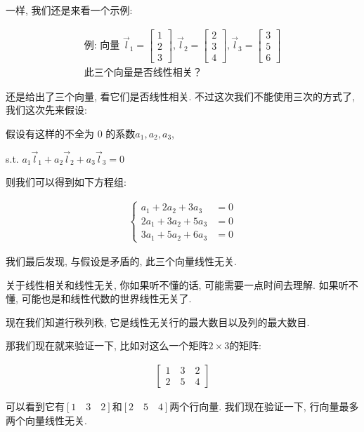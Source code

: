 一样, 我们还是来看一个示例: 

\begin{align*}
  \mbox{例: 向量 }\vec l_1 = \begin{bmatrix} 1 \\ 2 \\ 3  \end{bmatrix}, \vec l_2 = \begin{bmatrix} 2 \\ 3 \\ 4 \end{bmatrix}, \vec l_3 =  \begin{bmatrix} 3 \\ 5 \\ 6  \end{bmatrix} \\
  \mbox{此三个向量是否线性相关？}
\end{align*}

还是给出了三个向量, 看它们是否线性相关. 不过这次我们不能使用三次的方式了, 我们这次先来假设: 

假设有这样的不全为 0 的系数$a_1, a_2, a_3$, 

s.t. \(a_1 \vec l_1 + a_2 \vec l_2 + a_3 \vec l_3 = 0\)

则我们可以得到如下方程组: 

\begin{align*}
\begin{cases}
  a_1 + 2a_2 + 3a_3 & = 0 \\
  2a_1 + 3a_2 + 5a_3 & = 0 \\
  3a_1 + 5a_2 + 6a_3 & = 0
\end{cases}
\end{align*}

我们最后发现, 与假设是矛盾的, 此三个向量线性无关. 

关于线性相关和线性无关, 你如果听不懂的话, 可能需要一点时间去理解. 如果听不懂, 可能也是和线性代数的世界线性无关了. 

现在我们知道行秩列秩, 它是线性无关行的最大数目以及列的最大数目. 

那我们现在就来验证一下, 比如对这么一个矩阵$2 \times 3$的矩阵: 

\begin{align*}
  \begin{bmatrix} 1 \quad 3 \quad 2 \\ 2 \quad 5 \quad 4 \end{bmatrix}
\end{align*}

可以看到它有$[1 \quad 3 \quad 2]$和$[2 \quad 5 \quad 4]$两个行向量. 我们现在验证一下, 行向量最多两个向量线性无关. 

